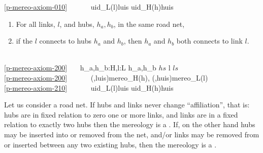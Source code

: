 {\ref{p-mereo-axiom-010}\ \ \ \ \ \  uid\_L(l){\ISIN}luis {\IS} uid\_H(h){\ISIN}huis  
\ep
\pos{\psno}{\mnewfoil}
\HHHH
\vspace*{2mm}
\begin{enumerate}\setei
\item \label{p-mereo-axiom-200} For all links, $l$, and hubs, $h_a, h_b$, in the same road net,
\item \label{p-mereo-axiom-210} if the $l$ connects to hubs $h_a$
  and $h_b$, then  $h_a$ and $h_b$ both connects to link $l$.
\savei\end{enumerate}\footsize\HHHH
\bp
{}\\
\ref{p-mereo-axiom-200}\ \ \ {\ALL} h\_a,h\_b:H,l:L {\RDOT} {\LBRACE}h\_a,h\_b{\RBRACE} {\SUBSETEQ} $hs$ {\WEDGE} l {\ISIN} $ls$ {\DBLRIGHTARROW}\\
\ref{p-mereo-axiom-200}\ \ \ \ \ \  ({\UNDERLINE},luis){\EQ}mereo\_H(h), ({\UNDERLINE},huis){\EQ}mereo\_L(l)\\
\ref{p-mereo-axiom-210}\ \ \ \ \ \  uid\_L(l){\ISIN}luis {\IS} uid\_H(h){\ISIN}huis  
\ep
}


\begynd
\pind Let us consider a road net. 
\begynd
\pind If hubs and links never change ``affiliation'', that is:
\begynd
\pind hubs are in fixed relation to zero one or more links, and
\pind links are in a fixed relation to exactly two hubs
\pind then the mereology is
      a . 
\afslut
\pos{\psno}{\mnewfoil}      
\pind If, on the other hand
\begynd
\pind hubs may be inserted into or removed from the net, and/or
\pind links may be removed from or inserted between any two existing hubs,
\pind then the mereology  is
      a . 
\afslut
\afslut
\afslut
 
